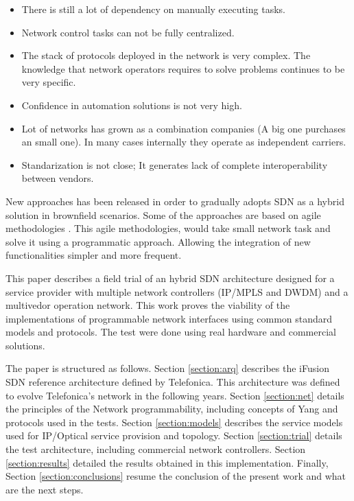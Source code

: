 \documentclass[a4paper,fleqn]{cas-dc}
\begin{document}
\begin{itemize}
    \item There is still a lot of dependency on manually executing tasks.
    \item Network control tasks can not be fully centralized.
    \item The stack of protocols deployed in the network is very complex.  The knowledge that network operators requires to solve problems continues to be very specific.
    \item Confidence in automation solutions is not very high.
    \item Lot of networks has grown as a combination companies (A big one purchases an small one). In many cases internally they operate as independent carriers. \item Standarization is not close; It generates lack of complete interoperability between vendors.
\end{itemize}

New approaches has been released in order to gradually adopts SDN as a hybrid solution in brownfield scenarios. Some of the approaches are based on agile methodologies \cite{devlic2012use,choi2018agile}. 
This agile methodologies, would take small network task and solve it using a programmatic approach. Allowing the integration of new functionalities simpler and more frequent.

This paper describes a field trial of an hybrid SDN architecture designed for a service provider with multiple network controllers (IP/MPLS and DWDM) and a multivedor operation network. This work proves the viability of the implementations of programmable network interfaces using common standard models and protocols. The test were done using real hardware and commercial solutions. 

The paper is structured as follows. Section \ref{section:arq} describes the iFusion SDN reference architecture defined by Telefonica. This architecture was defined to evolve Telefonica's network in the following years. Section \ref{section:net} details the principles of the Network programmability, including concepts of Yang and protocols used in the tests. Section \ref{section:models} describes the service models used for IP/Optical service provision and topology. Section \ref{section:trial} details the test architecture, including commercial network controllers. Section \ref{section:results} detailed the results obtained in this implementation. Finally, Section \ref{section:conclusions} resume the conclusion of the present work and what are the next steps.    
\end{document}
